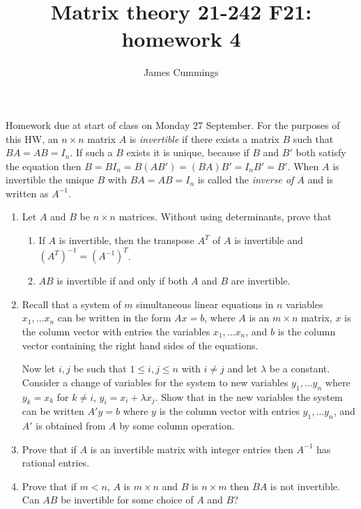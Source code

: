 \documentclass{amsart}
\title{Matrix theory 21-242 F21: homework 4}
\author{James Cummings}
\begin{document}
\maketitle
    
Homework due at start of class on Monday 27 September. For the purposes of this HW, an $n \times n$ matrix $A$ is
{\em invertible} if there exists a matrix $B$ such that $B A = A B = I_n$. If such a $B$ exists it is unique,
because if $B$ and $B'$ both satisfy the equation then $B = B I_n = B (A B') = (B A) B' = I_n B' = B'$.
When $A$ is invertible the unique $B$ with $B A = A B = I_n$ is called the {\em inverse of $A$} and is written as $A^{-1}$. 

\begin{enumerate}

\item  Let $A$ and $B$ be  $n \times n$ matrices.
  Without using determinants, prove that
  \begin{enumerate}
  \item If $A$ is invertible, then the transpose $A^T$ of $A$ is invertible and $(A^T)^{-1} = (A^{-1})^T$.  
  \item $A B$ is invertible if and only if both $A$ and $B$ are invertible.
  \end{enumerate}  



\item  Recall that a system of $m$ simultaneous linear equations in $n$ variables $x_1, \ldots x_n$ can be written in the form $A x = b$, where
  $A$ is an $m \times n$ matrix, $x$ is the column vector with entries the variables $x_1, \ldots x_n$, and $b$ is the column
  vector containing the right hand sides of the equations.
  
  Now let $i, j$ be such that $1 \le i, j \le n$ with $i \neq j$ and let $\lambda$ be a constant. Consider a change of variables for the system to
  new variables $y_1, \ldots y_n$ where $y_k = x_k$ for $k \neq i$, $y_i = x_i + \lambda x_j$. Show that in the new variables the system
  can be written $A' y = b$ where $y$ is the column vector with entries $y_1, \ldots y_n$, and  $A'$ is obtained from $A$ by some column operation. 
  
\item  Prove that if $A$ is an invertible matrix with integer entries then $A^{-1}$ has rational entries. 
  
\item Prove that if $m < n$, $A$ is $m \times n$ and $B$ is $n \times m$ then $B A$ is not invertible. Can
  $A B$ be invertible for some choice of $A$ and $B$? 


\end{enumerate}
\end{document}
